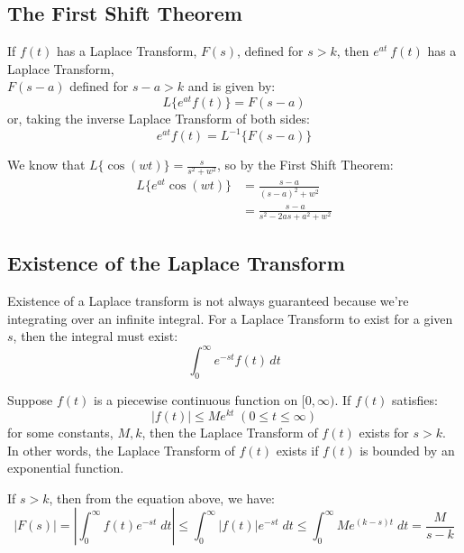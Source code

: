 \documentclass[a4paper, 10pt]{article}
\begin{document}
\subsection{The First Shift Theorem}
\begin{theorembox}
  If $f(t)$ has a Laplace Transform, $F(s)$, defined for $s > k$, then $e^{at}\ f(t)$ has a Laplace Transform, \\ $F(s-a)$ defined for $s - a > k$ and is given by:
  $$L\{e^{at} f(t)\} = F(s-a)$$
  or, taking the inverse Laplace Transform of both sides:
  $$e^{at}f(t) = L^{-1}\{F(s-a)\}$$
\end{theorembox}
\begin{examplebox}
  We know that $L\{\cos(wt)\} = \frac{s}{s^2 + w^2}$, so by the First Shift Theorem:
  \begin{align*}
    L\{e^{at}\cos(wt)\} & = \frac{s-a}{(s-a)^2 + w^2}         \\
                        & = \frac{s-a}{s^2 - 2as + a^2 + w^2}
  \end{align*}
\end{examplebox}
\subsection{Existence of the Laplace Transform}
Existence of a Laplace transform is not always guaranteed because we're integrating over an infinite integral. For a Laplace Transform to exist for a given $s$, then the integral must exist:
$$\int_0^\infty e^{-st}f(t)\, dt$$

\begin{theorembox}
  Suppose $f(t)$ is a piecewise continuous function on $[0,\infty)$. If $f(t)$ satisfies:
  $$|f(t)| \leq Me^{kt} \; (0 \leq t \leq \infty)$$
  for some constants, $M, k$, then the Laplace Transform of $f(t)$ exists for $s > k$. In other words, the Laplace Transform of $f(t)$ exists if $f(t)$ is bounded by an exponential function.
\end{theorembox}

\begin{proofbox}
  If $s > k$, then from the equation above, we have:
  $$|F(s)| = \left | \int_0^\infty f(t)e^{-st} \; dt  \right | \leq \int_{0}^{\infty} |f(t)| e^{-st} \; dt \leq \int_{0}^\infty Me^{(k-s)t} \; dt = \frac{M}{s-k}$$
\end{proofbox}

\pagebreak
\end{document}
